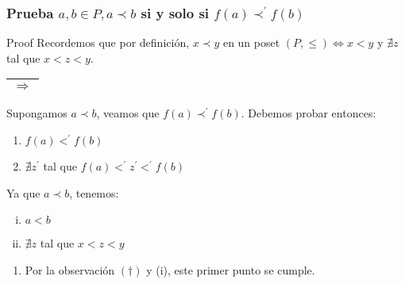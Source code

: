 \begin{frame}
	\frametitle{Prueba $a, b \in P, a \prec b$ si y solo si $f(a) \prec^{\prime} f(b)$}

	\begin{block}{Proof}
		\PN Recordemos que por definición, $x \prec y$ en un poset $(P, \leq) \Leftrightarrow x < y$ y  $\nexists z$ tal que
		$x < z < y$.

		\vspace{3mm}
		\PN \begin{tabular}{|c|} \hline $\Rightarrow$ \\\hline \end{tabular} Supongamos $a \prec b$, veamos que $f(a)
		\prec^{\prime} f(b)$. Debemos probar entonces:
	  \begin{enumerate}[1)]
	    \item $f(a) <^{\prime} f(b)$
	    \item $\nexists z^{\prime}$ tal que $f(a) <^{\prime} z^{\prime} <^{\prime} f(b)$
	  \end{enumerate}

		\vspace{2mm}
	  \PN Ya que $a \prec b$, tenemos:
		\begin{enumerate}[i)]
			\item $a < b$
			\item $\nexists z$ tal que $x < z < y$
		\end{enumerate}

		\begin{enumerate}[1)]
	  	\item Por la observación $(\dag)$ y (i), este primer punto se cumple.
		\end{enumerate}
	\end{block}
\end{frame}
